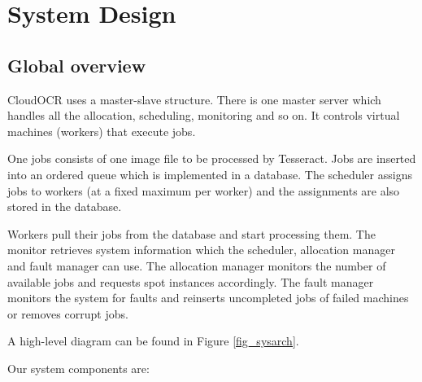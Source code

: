 \documentclass[a4paper]{IEEEtran}
\begin{document}
\section{System Design}
\label{sec:systemdesign}

\subsection*{Global overview}

CloudOCR uses a master-slave structure. There is one master server which handles all the allocation, scheduling, monitoring and so on. It controls virtual machines (workers) that execute jobs.

One jobs consists of one image file to be processed by Tesseract. Jobs are inserted into an ordered queue which is implemented in a database. The scheduler assigns jobs to workers (at a fixed maximum per worker) and the assignments are also stored in the database.

Workers pull their jobs from the database and start processing them. The monitor retrieves system information which the scheduler, allocation manager and fault manager can use. The allocation manager monitors the number of available jobs and requests spot instances accordingly. The fault manager monitors the system for faults and reinserts uncompleted jobs of failed machines or removes corrupt jobs.

A high-level diagram can be found in Figure \ref{fig_sysarch}.

Our system components are:
\end{document}
